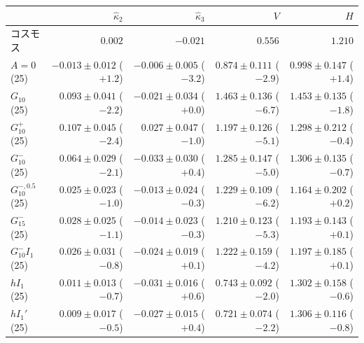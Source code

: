 \begin{tabular}{lrrrr}
\toprule
& $\hat\kappa_2$ & $\hat\kappa_3$ & $V$ & $H$ \\
\midrule
コスモス & $0.002$ & $-0.021$ & $0.556$ & $1.210$ \\
\midrule
$A = 0$ (25) & $-0.013 \pm 0.012$ ($+1.2$) & $-0.006 \pm 0.005$ ($-3.2$) & $0.874 \pm 0.111$ ($-2.9$) & $0.998 \pm 0.147$ ($+1.4$) \\
$G_{10}$ (25) & $0.093 \pm 0.041$ ($-2.2$) & $-0.021 \pm 0.034$ ($+0.0$) & $1.463 \pm 0.136$ ($-6.7$) & $1.453 \pm 0.135$ ($-1.8$) \\
$G_{10}^{+}$ (25) & $0.107 \pm 0.045$ ($-2.4$) & $0.027 \pm 0.047$ ($-1.0$) & $1.197 \pm 0.126$ ($-5.1$) & $1.298 \pm 0.212$ ($-0.4$) \\
$G_{10}^{-}$ (25) & $0.064 \pm 0.029$ ($-2.1$) & $-0.033 \pm 0.030$ ($+0.4$) & $1.285 \pm 0.147$ ($-5.0$) & $1.306 \pm 0.135$ ($-0.7$) \\
$G_{10}^{-,0.5}$ (25) & $0.025 \pm 0.023$ ($-1.0$) & $-0.013 \pm 0.024$ ($-0.3$) & $1.229 \pm 0.109$ ($-6.2$) & $1.164 \pm 0.202$ ($+0.2$) \\
$G_{15}^{-}$ (25) & $0.028 \pm 0.025$ ($-1.1$) & $-0.014 \pm 0.023$ ($-0.3$) & $1.210 \pm 0.123$ ($-5.3$) & $1.193 \pm 0.143$ ($+0.1$) \\
$G_{10}^{-}I_{1}$ (25) & $0.026 \pm 0.031$ ($-0.8$) & $-0.024 \pm 0.019$ ($+0.1$) & $1.222 \pm 0.159$ ($-4.2$) & $1.197 \pm 0.185$ ($+0.1$) \\
$hI_{1}$ (25) & $0.011 \pm 0.013$ ($-0.7$) & $-0.031 \pm 0.016$ ($+0.6$) & $0.743 \pm 0.092$ ($-2.0$) & $1.302 \pm 0.158$ ($-0.6$) \\
$hI_{1}'$ (25) & $0.009 \pm 0.017$ ($-0.5$) & $-0.027 \pm 0.015$ ($+0.4$) & $0.721 \pm 0.074$ ($-2.2$) & $1.306 \pm 0.116$ ($-0.8$) \\
\bottomrule
\end{tabular}
